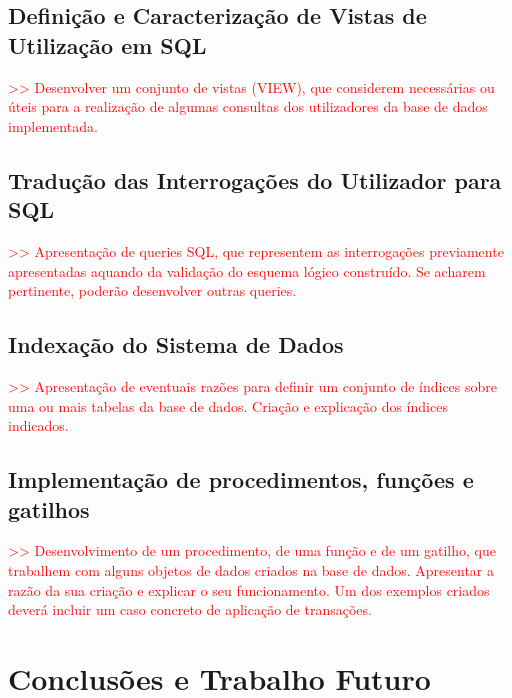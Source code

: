 \documentclass[a4paper,12pt]{scrreprt}
\begin{document}
\section{Definição e Caracterização de Vistas de Utilização em SQL}
\textcolor{red}{>> Desenvolver um conjunto de vistas (VIEW), que considerem necessárias ou úteis para a realização de algumas consultas dos utilizadores da base de dados implementada.}

\section{Tradução das Interrogações do Utilizador para SQL}
\textcolor{red}{>> Apresentação de queries SQL, que representem as interrogações previamente apresentadas aquando da validação do esquema lógico construído. Se acharem pertinente, poderão desenvolver outras queries.}

\section{Indexação do Sistema de Dados}
\textcolor{red}{>> Apresentação de eventuais razões para definir um conjunto de índices sobre uma ou mais tabelas da base de dados. Criação e explicação dos índices indicados.}

\section{Implementação de procedimentos, funções e gatilhos}
\textcolor{red}{>> Desenvolvimento de um procedimento, de uma função e de um gatilho, que trabalhem com alguns objetos de dados criados na base de dados. Apresentar a razão da sua criação e explicar o seu funcionamento. Um dos exemplos criados deverá incluir um caso concreto de aplicação de transações.}



\chapter{Conclusões e Trabalho Futuro}
\end{document}
